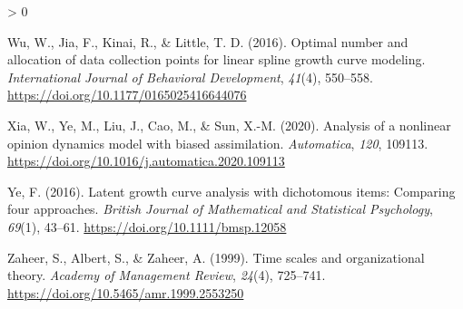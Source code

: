 \documentclass[
12pt, %
twoside,
english]{guelphthesis}
\newlength{\cslhangindent}
\newenvironment{CSLReferences}[2] %
 {%
  \setlength{\parindent}{0pt}
  \ifodd #1 \everypar{\setlength{\hangindent}{\cslhangindent}}\ignorespaces\fi
  \ifnum #2 > 0
  \setlength{\parskip}{\linespacing{2}}
  \fi
 }%
 {}
\begin{document}
\begin{CSLReferences}{1}{0}
\leavevmode{}%
Wu, W., Jia, F., Kinai, R., \& Little, T. D. (2016). Optimal number and allocation of data collection points for linear spline growth curve modeling. \emph{International Journal of Behavioral Development}, \emph{41}(4), 550--558. \url{https://doi.org/10.1177/0165025416644076}

\leavevmode{}%
Xia, W., Ye, M., Liu, J., Cao, M., \& Sun, X.-M. (2020). Analysis of a nonlinear opinion dynamics model with biased assimilation. \emph{Automatica}, \emph{120}, 109113. \url{https://doi.org/10.1016/j.automatica.2020.109113}

\leavevmode{}%
Ye, F. (2016). Latent growth curve analysis with dichotomous items: Comparing four approaches. \emph{British Journal of Mathematical and Statistical Psychology}, \emph{69}(1), 43--61. \url{https://doi.org/10.1111/bmsp.12058}

\leavevmode{}%
Zaheer, S., Albert, S., \& Zaheer, A. (1999). Time scales and organizational theory. \emph{Academy of Management Review}, \emph{24}(4), 725--741. \url{https://doi.org/10.5465/amr.1999.2553250}

\end{CSLReferences}
\end{document}
